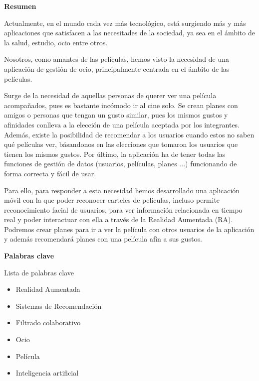
\newpage

\thispagestyle{empty}

\begin{center}

{\bf \Huge Resumen}

  \end{center}
\vspace{1cm}

Actualmente, en el mundo cada vez más tecnológico, está surgiendo más y más aplicaciones que satisfacen
a las necesitades de la sociedad, ya sea en el ámbito de la salud, estudio, ocio entre otros.

Nosotros, como amantes de las películas, hemos visto la necesidad de una aplicación de gestión de ocio,
principalmente centrada en el ámbito de las películas. 

Surge de la necesidad de aquellas personas de querer ver una película acompañados, pues es bastante 
incómodo ir al cine solo. Se crean planes con amigos o personas que tengan un gusto similar, pues los mismos
gustos y afinidades conlleva a la elección de una película aceptada por los integrantes. Además, existe la posibilidad
de recomendar a los usuarios cuando estos no saben qué películas ver, básandonos en las elecciones que tomaron
los usuarios que tienen los mismos gustos. Por último, la aplicación ha de tener todas las funciones de gestión de 
datos (usuarios, películas, planes ...) funcionando de forma correcta y fácil de usar.

Para ello, para responder a esta necesidad hemos desarrollado una aplicación móvil 
con la que poder reconocer carteles de películas, incluso permite reconocimiento facial de usuarios, para 
ver información relacionada en tiempo real y poder interactuar con ella a 
través de la Realidad Aumentada (RA). Podremos crear planes para ir a ver la película con otros 
usuarios de la aplicación y además recomendará planes con una película afín a sus gustos.

\vspace{1cm}


\begin{center}

{\bf \Large Palabras clave}

   \end{center}

   \vspace{0.5cm}
   
   Lista de palabras clave
   \begin{itemize}  
    \item Realidad Aumentada
    \item Sistemas de Recomendación
    \item Filtrado colaborativo
    \item Ocio
    \item Película
    \item Inteligencia artificial
  \end{itemize}
   


